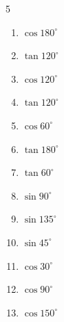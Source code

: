 \begin{multicols}{5}
\begin{enumerate}
  \item $\displaystyle \cos{180^\circ}$

        \phantom{$\displaystyle =-1$}

  \item $\displaystyle \tan{120^\circ}$


  \item $\displaystyle \cos{120^\circ}$


  \item $\displaystyle \tan{120^\circ}$


  \item $\displaystyle \cos{60^\circ}$


  \item $\displaystyle \tan{180^\circ}$

        \phantom{$\displaystyle =0$}

  \item $\displaystyle \tan{60^\circ}$


  \item $\displaystyle \sin{90^\circ}$

        \phantom{$\displaystyle =1$}

  \item $\displaystyle \sin{135^\circ}$


  \item $\displaystyle \sin{45^\circ}$


\columnbreak %

\resetques

  \item $\displaystyle \cos{30^\circ}$


  \item $\displaystyle \cos{90^\circ}$

        \phantom{$\displaystyle =0$}

  \item $\displaystyle \cos{150^\circ}$


\end{enumerate}
\end{multicols}
